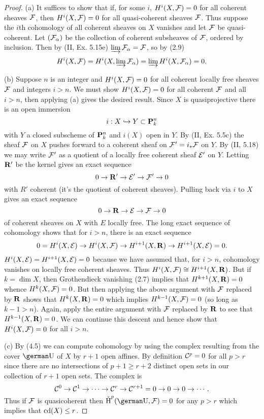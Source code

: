 \documentclass[12pt]{article}
\begin{document}
\begin{proof}
(a) It suffices to show that if, for some $i$,
$H^i(X,\F)=0$ for all coherent sheaves $\F$,
then $H^i(X,\F)=0$ for all quasi-coherent sheaves $\F$. 
Thus suppose the $i$th cohomology of all coherent
sheaves on $X$ vanishes and let $\F$ be quasi-coherent.
Let $(\F_{\alpha})$ be the collection of coherent subsheaves
of $\F$, ordered by inclusion. Then by (II, Ex. 5.15e)
$\varinjlim\F_{\alpha}=\F$, so by (2.9)
$$H^i(X,\F)=H^i(X,\varinjlim \F_{\alpha})=\varinjlim H^i(X,\F_{\alpha})=0.$$

(b) Suppose $n$ is an integer and $H^i(X,\F)=0$ for all coherent
locally free sheaves $\F$ and integers $i>n$. We must show
$H^i(X,\F)=0$ for all coherent $\F$ and all $i>n$, then applying
(a) gives the desired result. Since $X$ is quasiprojective
there is an open immersion 
     $$i:X\hookrightarrow Y\subset \P_k^n$$
with $Y$ a closed subscheme of $\P_k^n$ and $i(X)$ open in $Y$.
By (II, Ex. 5.5c) the sheaf $\F$ on $X$ pushes forward to a coherent
sheaf on $\F'=i_{*}\F$ on $Y$.
By (II, 5.18) we may write $\F'$ as a quotient of a locally 
free coherent sheaf $\E'$ on $Y$. Letting $\R'$ be the kernel
gives an exact sequence 
$$0\into\R'\into\E'\into\F'\into 0$$
with $R'$ coherent (it's the quotient of coherent sheaves). 
Pulling back via $i$ to $X$ gives an exact sequence 
$$0\into\R\into\E\into\F\into 0$$ 
of coherent sheaves on $X$ with $E$ locally free.  
The long exact sequence of cohomology shows
that for $i>n$, there is an exact sequence
$$0=H^i(X,\E)\into H^i(X,\F) \into H^{i+1}(X,\R) \into 
         H^{i+1}(X,\E)=0.$$
$H^i(X,\E)=H^{i+1}(X,\E)=0$ because we have assumed that, for $i>n$,
cohomology vanishes on locally free coherent sheaves.
Thus $H^i(X,\F)\isom H^{i+1}(X,\R)$. But if $k=\dim X$, then
Grothendieck vanishing (2.7) implies that
$H^{k+1}(X,\R)=0$ whence $H^{k}(X,\F)=0$. 
But then applying the above argument with $\F$ replaced
by $\R$ shows that $H^{k}(X,\R)=0$ which implies $H^{k-1}(X,\F)=0$
(so long as $k-1>n$). Again, apply the entire argument
with $\F$ replaced by $\R$ to see that $H^{k-1}(X,\R)=0$. 
We can continue this descent and hence show that 
$H^{i}(X,\F)=0$ for all $i>n$.

(c) By (4.5) we can compute cohomology by using the \cech{}
complex resulting from the cover $\sU$ of $X$ by $r+1$ open
affines. By definition $\sC^p=0$ for all $p>r$ since
there are no intersections of $p+1\geq r+2$ distinct open sets 
in our collection of $r+1$ open sets. The \cech{} complex is
$$\sC^0\into\sC^1\into\cdots\into\sC^r\into\sC^{r+1}=0\into 0\into 0\into \cdots.$$
Thus if $\sF$ is quasicoherent then $\cH^p(\sU,\sF)=0$ 
for any $p>r$ which implies that $\cd(X)\leq r$.  


\end{proof}
\end{document}
